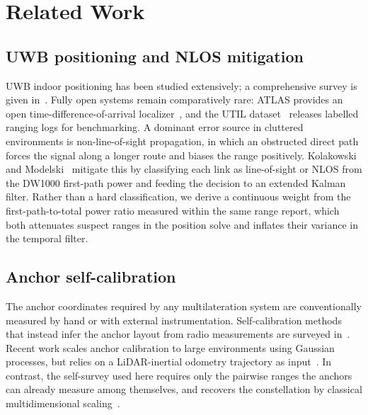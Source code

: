 \section{Related Work}
\label{sec:related}

\subsection{UWB positioning and NLOS mitigation}
UWB indoor positioning has been studied extensively; a comprehensive
survey is given in~\cite{alarifi2016uwb}. Fully open systems remain
comparatively rare: ATLAS provides an open time-difference-of-arrival
localizer~\cite{tiemann2017atlas}, and the UTIL dataset~\cite{zhao2024util}
releases labelled ranging logs for benchmarking. A dominant error source
in cluttered environments is non-line-of-sight propagation, in which an
obstructed direct path forces the signal along a longer route and biases
the range positively. Kolakowski and Modelski~\cite{kolakowski2017nlos}
mitigate this by classifying each link as line-of-sight or NLOS from the
DW1000 first-path power and feeding the decision to an extended Kalman
filter. Rather than a hard classification, we derive a continuous weight
from the first-path-to-total power ratio measured within the same range
report, which both attenuates suspect ranges in the position solve and
inflates their variance in the temporal filter.

\subsection{Anchor self-calibration}
The anchor coordinates required by any multilateration system are
conventionally measured by hand or with external instrumentation.
Self-calibration methods that instead infer the anchor layout from radio
measurements are surveyed in~\cite{ridolfi2021selfcal}. Recent work
scales anchor calibration to large environments using Gaussian
processes, but relies on a LiDAR-inertial odometry trajectory as
input~\cite{yuan2025uwbgp}. In contrast, the self-survey used here
requires only the pairwise ranges the anchors can already measure among
themselves, and recovers the constellation by classical multidimensional
scaling~\cite{torgerson1952mds}.
